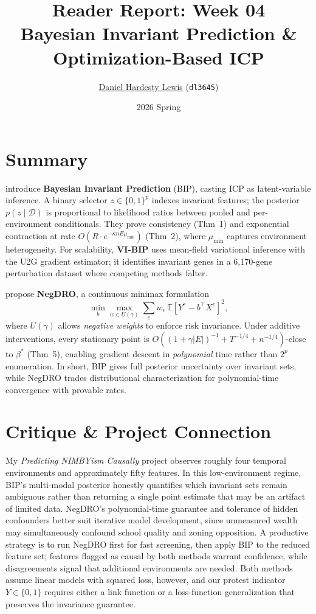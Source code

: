 \documentclass[11pt]{article}
\title{\vspace{-2.5em}\textbf{Reader Report: Week 04} \\ \vspace{0.1em} \large Bayesian Invariant Prediction \& Optimization-Based ICP}
\author{\href{https://github.com/dhardestylewis}{Daniel Hardesty Lewis} (\texttt{dl3645})}
\date{\vspace{-0.5em}2026 Spring}
\begin{document}
\maketitle
\thispagestyle{fancy}
\vspace{-1em}

\section*{Summary}
\citet{wu2025bayesian} introduce \textbf{Bayesian Invariant Prediction} (BIP), casting ICP as latent-variable inference. A binary selector $z\in\{0,1\}^p$ indexes invariant features; the posterior $p(z\mid\mathcal{D})$ is proportional to likelihood ratios between pooled and per-environment conditionals. They prove consistency (Thm~1) and exponential contraction at rate $O(R\cdot e^{-\kappa nE\mu_{\min}})$ (Thm~2), where $\mu_{\min}$ captures environment heterogeneity. For scalability, \textbf{VI-BIP} uses mean-field variational inference with the U2G gradient estimator; it identifies invariant genes in a 6{,}170-gene perturbation dataset where competing methods falter.

\citet{fan2024negdro} propose \textbf{NegDRO}, a continuous minimax formulation
\[
  \min_{b}\max_{w\in U(\gamma)}\textstyle\sum_e w_e\,\mathbb{E}[Y^e{-}b^\top X^e]^2,
\]
where $U(\gamma)$ allows \emph{negative weights} to enforce risk invariance. Under additive interventions, every stationary point is $O((1{+}\gamma|E|)^{-1}{+}T^{-1/4}{+}n^{-1/4})$-close to $\beta^*$ (Thm~5), enabling gradient descent in \emph{polynomial} time rather than $2^p$ enumeration. In short, BIP gives full posterior uncertainty over invariant sets, while NegDRO trades distributional characterization for polynomial-time convergence with provable rates.

\section*{Critique \& Project Connection}
My \textit{Predicting NIMBYism Causally} project observes roughly four temporal environments and approximately fifty features. In this low-environment regime, BIP's multi-modal posterior honestly quantifies which invariant sets remain ambiguous rather than returning a single point estimate that may be an artifact of limited data. NegDRO's polynomial-time guarantee and tolerance of hidden confounders better suit iterative model development, since unmeasured wealth may simultaneously confound school quality and zoning opposition. A productive strategy is to run NegDRO first for fast screening, then apply BIP to the reduced feature set; features flagged as causal by both methods warrant confidence, while disagreements signal that additional environments are needed. Both methods assume linear models with squared loss, however, and our protest indicator $Y\in\{0,1\}$ requires either a link function or a loss-function generalization that preserves the invariance guarantee.
\end{document}
